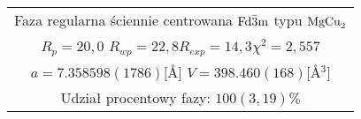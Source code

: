 \documentclass[a4paper,12pt]{article}
\numberwithin{equation}{section}
\newcommand{\nit}[1]{\textnormal{#1}}
\begin{document}
\begin{appendices}
\begin{longtable}[c]{|c|c|c|c|c|c|c|}
    \multicolumn{7}{|c|}{ Faza regularna ściennie centrowana $\nit{Fd}\bar{3}\nit{m}$ typu $\nit{MgCu}_2$ }\\
    \multicolumn{7}{|c|}{ $R_p=20,0$ \hspace{0.4cm}$R_{wp}=22,8$\hspace{0.4cm}$R_{exp}=14,3$\hspace{0.4cm}$\chi^2=2,557$  }\\
    \multicolumn{7}{|c|}{ $a=7.358598(1786) [$\AA$]$ \hspace{0.4cm}$V=398.460(168)[$\AA$^3]$ }\\
    \multicolumn{7}{|c|}{ Udział procentowy fazy: $100(3,19)\%$ }\\\hline

 \end{longtable}




\end{appendices}
\end{document}
